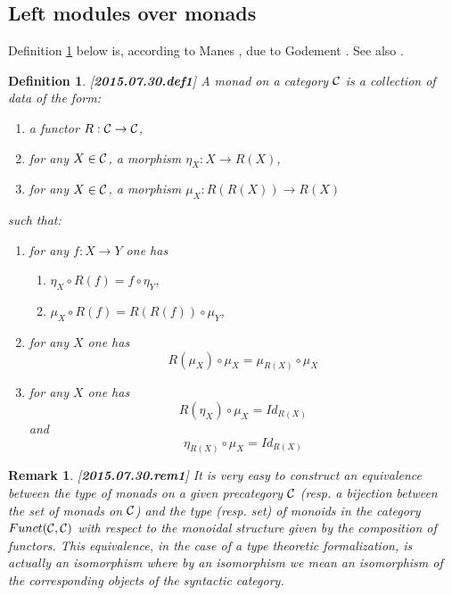 \documentclass[11pt]{article}
\newtheorem{definition}[proposition]{Definition}
\newtheorem{remark}[proposition]{Remark}
\newcommand{\llabel}[1]{\label{#1}[{\bf #1}]}
\newcommand{\sr}{\rightarrow}
\begin{document}
\subsection{Left modules over monads}
%
Definition \ref{2015.07.30.def1} below is, according to Manes \cite[p.30]{Manes}, due to Godement \cite{Godement}. See also \cite[Ch. VI]{MacLane}.
%
\begin{definition}
\llabel{2015.07.30.def1}
A monad on a category $\cal C$ is a collection of data of the form:
%
\begin{enumerate}
\item a functor $R:{\cal C}\sr {\cal C}$,
\item for any $X\in {\cal C}$, a morphism $\eta_X:X\sr R(X)$,
\item for any $X\in {\cal C}$, a morphism $\mu_X:R(R(X))\sr R(X)$
\end{enumerate}
%
such that:
%
\begin{enumerate}
\item for any $f:X\sr Y$ one has 
%
\begin{enumerate}
\item $\eta_X\circ R(f)=f\circ \eta_Y$,
\item $\mu_X\circ R(f)=R(R(f))\circ \mu_Y$,
\end{enumerate}
%
\item for any $X$ one has 
%
$$R(\mu_X)\circ \mu_X=\mu_{R(X)}\circ \mu_X$$
%
\item for any $X$ one has
%
$$R(\eta_X)\circ \mu_X=Id_{R(X)}$$
%
and
%
$$\eta_{R(X)}\circ \mu_X=Id_{R(X)}$$
%
\end{enumerate}
\end{definition}
%
\begin{remark}\rm
\llabel{2015.07.30.rem1}
It is very easy to construct an equivalence between the type of monads on a given precategory $\cal C$ (resp. a bijection between the set of monads on $\cal C$) and the type (resp. set) of monoids in the category $Funct({\cal C},{\cal C})$ with respect to the monoidal structure given by the composition of functors. This equivalence, in the case of a type theoretic formalization, is actually an isomorphism where by an isomorphism we mean an isomorphism of the corresponding objects of the syntactic category. 
\end{remark}
%
\end{document}
